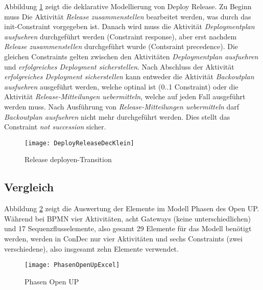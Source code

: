 Abbildung \ref{fig:DeployReleaseDecKlein} zeigt die deklarative Modellierung von Deploy Release.\newline
Zu Beginn muss Die Aktivität \textit{Release zusammenstellen} bearbeitet werden, was durch das init-Constraint vorgegeben ist. Danach wird muss die Aktivität \textit{Deploymentplan ausfuehren} durchgeführt werden (Constraint response), aber erst nachdem \textit{Release zusammenstellen} durchgeführt wurde (Contsraint precedence).\newline
Die gleichen Constraints gelten zwischen den Aktivitäten \textit{Deploymentplan ausfuehren} und \textit{erfolgreiches Deployment sicherstellen}.\newline
Nach Abschluss der Aktivität \textit{erfolgreiches Deployment sicherstellen} kann entweder die Aktivität \textit{Backoutplan ausfuehren} ausgeführt werden, welche optinal ist (0..1 Constraint) oder die Aktivität \textit{Release-Mitteilungen uebermitteln}, welche auf jeden Fall ausgeführt werden muss.\newline 
Nach Ausführung von \textit{Release-Mitteilungen uebermitteln} darf \textit{Backoutplan ausfuehren} nicht mehr durchgeführt werden. Dies stellt das Constraint \textit{not succession} sicher.
\begin{figure}[htp]
\begin{center}
  \texttt{[image: DeployReleaseDecKlein]} %
  \caption{Release deployen-Transition}
  \label{fig:DeployReleaseDecKlein}
\end{center}
\end{figure}

\clearpage

\subsection{Vergleich}

Abbildung \ref{fig:PhasenOpenUpExcel} zeigt die Auswertung der Elemente im Modell Phasen des Open UP. Während bei BPMN vier Aktivitäten, acht Gateways (keine unterschiedlichen) und 17 Sequenzflusselemente, also gesamt 29 Elemente für das Modell benötigt werden, werden in ConDec nur vier Aktivitäten und sechs Constraints (zwei verschiedene), also insgesamt zehn Elemente verwendet.

\begin{figure}[htp]
\begin{center}
  \texttt{[image: PhasenOpenUpExcel]} %
  \caption{Phasen Open UP}
  \label{fig:PhasenOpenUpExcel}
\end{center}
\end{figure}



